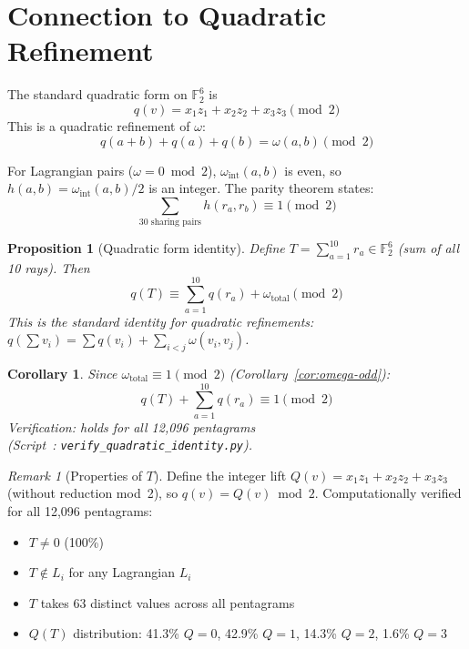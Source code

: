 \documentclass[11pt,a4paper]{article}
\newtheorem{corollary}[theorem]{Corollary}
\newtheorem{proposition}[theorem]{Proposition}
\theoremstyle{remark}
\newtheorem{remark}[theorem]{Remark}
\newcommand{\F}{\mathbb{F}}
\begin{document}
\section{\texorpdfstring{Connection to Quadratic Refinement}{Connection to Quadratic Refinement}}
\label{sec:quadratic}

The standard quadratic form on $\F_2^6$ is
\[
q(v) = x_1 z_1 + x_2 z_2 + x_3 z_3 \pmod{2}
\]
This is a quadratic refinement of $\omega$:
\[
q(a+b) + q(a) + q(b) = \omega(a, b) \pmod{2}
\]

For Lagrangian pairs ($\omega = 0 \bmod 2$), $\omega_{\text{int}}(a,b)$
is even, so $h(a,b) = \omega_{\text{int}}(a,b)/2$ is an integer. The
parity theorem states:
\[
\sum_{\text{30 sharing pairs}} h(r_a, r_b) \equiv 1 \pmod{2}
\]

\begin{proposition}[Quadratic form identity]
  Define $T = \sum_{a=1}^{10} r_a \in \F_2^6$ (sum of all 10 rays).
  Then
  \[
  q(T) \equiv \sum_{a=1}^{10} q(r_a) + \omega_{\text{total}} \pmod{2}
  \]
  This is the standard identity for quadratic refinements:
  $q(\sum v_i) = \sum q(v_i) + \sum_{i<j} \omega(v_i, v_j)$.
\end{proposition}

\begin{corollary}
  Since $\omega_{\text{total}} \equiv 1 \pmod{2}$
  (Corollary~\ref{cor:omega-odd}):
  \[
  q(T) + \sum_{a=1}^{10} q(r_a) \equiv 1 \pmod{2}
  \]
  Verification: holds for all 12{,}096 pentagrams
  \\(Script~\cite{PaperXIsuppl}: \texttt{verify\_quadratic\_identity.py}).
\end{corollary}

\begin{remark}[Properties of $T$]
  Define the integer lift $Q(v) = x_1 z_1 + x_2 z_2 + x_3 z_3$
  (without reduction mod~2), so $q(v) = Q(v) \bmod 2$.
  Computationally verified for all 12{,}096 pentagrams:
  \begin{itemize}
  \item $T \neq 0$ (100\%)
  \item $T \notin L_i$ for any Lagrangian $L_i$
  \item $T$ takes 63 distinct values across all pentagrams
  \item $Q(T)$ distribution: 41.3\% $Q=0$, 42.9\% $Q=1$, 14.3\% $Q=2$,
    1.6\% $Q=3$
  \end{itemize}
\end{remark}
\end{document}

